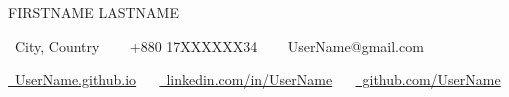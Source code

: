 \begingroup
\centering

{\LARGE\color{ACCENT_COLOR}\MakeUppercase{FirstName LastName}}\par

{\fontsize{10pt}{12pt}\selectfont
  \raisebox{-0.1\height}\faHome\ City, Country
  ~~
  \raisebox{-0.1\height}\faPhone\ +880 17XXXXXX34 
  ~~ 
  \raisebox{-0.1\height}\faEnvelope\  UserName@gmail.com
}\par


{\fontsize{10pt}{12pt}\selectfont
  \href{https://UserName.github.io/portfolio/}{\raisebox{-0.1\height}\faGlobe\ UserName.github.io}
  ~~
  \href{https://www.linkedin.com/in/UserName/}{\raisebox{-0.1\height}\faLinkedin\ linkedin.com/in/UserName}
  ~~
  \href{https://github.com/UserName}{\raisebox{-0.1\height}\faGithub\ github.com/UserName}
}


\par
\endgroup
